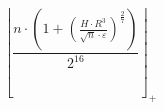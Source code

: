\[\left\lfloor \frac{n \cdot \left(1 + \left(\frac{H \cdot R^{3}}{\sqrt{n} \cdot \varepsilon}\right)^{\frac{2}{7}}\right)}{2^{16}} \right\rfloor_{+}\]
